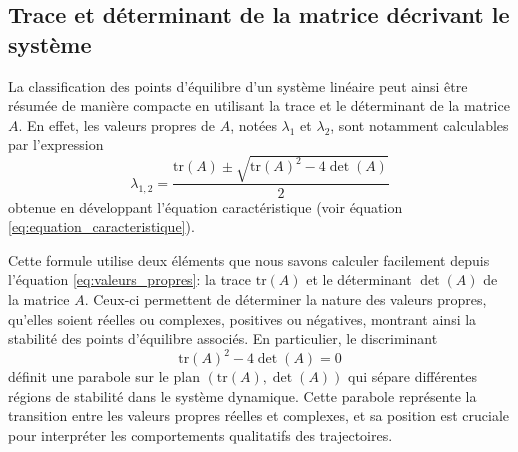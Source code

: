         \subsection{Trace et déterminant de la matrice décrivant le système}
            La classification des points d'équilibre d'un système linéaire peut ainsi être résumée de manière compacte en utilisant la trace et le déterminant de la matrice $A$. En effet, les valeurs propres de $A$, notées $\lambda_1$ et $\lambda_2$, sont notamment calculables par l'expression
            \begin{equation}
                \lambda_{1,2} = \frac{\text{tr}(A) \pm \sqrt{\text{tr}(A)^2 - 4 \det(A)}}{2}
            \end{equation}
            obtenue en développant l'équation caractéristique (voir équation \ref{eq:equation_caracteristique}).
            
            Cette formule utilise deux éléments que nous savons calculer facilement depuis l'équation \ref{eq:valeurs_propres}: la trace $\text{tr}(A)$ et le déterminant $\det(A)$ de la matrice $A$. Ceux-ci permettent de déterminer la nature des valeurs propres, qu'elles soient réelles ou complexes, positives ou négatives, montrant ainsi la stabilité des points d'équilibre associés. En particulier, le discriminant 
            \begin{equation}
                \text{tr}(A)^2 - 4 \det(A) = 0
            \end{equation}
            définit une parabole sur le plan $(\text{tr}(A), \det(A))$ qui sépare différentes régions de stabilité dans le système dynamique. Cette parabole représente la transition entre les valeurs propres réelles et complexes, et sa position est cruciale pour interpréter les comportements qualitatifs des trajectoires. 

